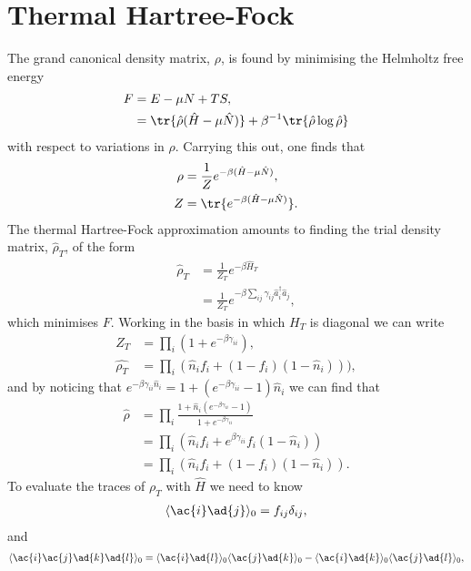 \documentclass[11pt,twosided]{article}
\begin{document}
\section{Thermal Hartree-Fock}
The grand canonical density matrix, $\rho$, is found by minimising the Helmholtz free energy
\begin{align}
F &= E - \mu N + TS,\\
  &= \tr{\hat{\rho}(\hat{H} - \mu \hat{N})} + \beta^{-1}\tr{\hat{\rho}\log \hat{\rho}}
\end{align}
with respect to variations in $\rho$.
Carrying this out, one finds that
\begin{align}
\rho &= \frac{1}{Z}e^{-\beta(\hat{H}-\mu \hat{N})},\\
Z &= \tr{e^{-\beta(\hat{H}-\mu \hat{N})}}.
\end{align}
The thermal Hartree-Fock approximation amounts to finding the trial density matrix, $\hat{\rho}_T$, of the form
\begin{align}
\hat{\rho}_T &= \frac{1}{Z_T} e^{-\beta \hat{H}_T}\\
			 &= \frac{1}{Z_T} e^{-\beta \sum_{ij} \gamma_{ij} \hat{a}^{\dagger}_i \hat{a}_j},
\end{align}
which minimises $F$.
Working in the basis in which $H_T$ is diagonal we can write
\begin{align}
Z_T &= \prod_i (1+e^{-\beta \gamma_{ii}}),\\
\hat{\rho_T} &= \prod_i(\hat{n}_if_i + (1-f_i)(1-\hat{n}_i))),
\end{align}
and by noticing that $e^{-\beta \gamma_{ii}\hat{n}_i} = 1 + (e^{-\beta \gamma_{ii}}-1)\hat{n}_i$ we can find that
\begin{align}
\hat{\rho} &= \prod_i\frac{1+\hat{n}_i (e^{-\beta \gamma_{ii}}-1)}{1+e^{-\beta \gamma_{ii}}}\\
		   &= \prod_i  (\hat{n}_if_i + e^{\beta\gamma_{ii}}f_i(1-\hat{n}_i) )\\
		   &= \prod_i ( \hat{n}_i f_i + (1-f_i)(1-\hat{n}_i)).
\end{align}
To evaluate the traces of $\rho_T$ with $\hat{H}$ we need to know
\begin{align}
\langle \ac{i} \ad{j} \rangle_0 = f_{ij} \delta_{ij},
\end{align}
and
\begin{align}
\langle \ac{i} \ac{j} \ad{k} \ad{l} \rangle_0 = \langle \ac{i} \ad{l} \rangle_0 \langle\ac{j}  \ad{k} \rangle_0 - \langle \ac{i} \ad{k} \rangle_0 \langle\ac{j} \ad{l} \rangle_0,
\end{align}
\end{document}
